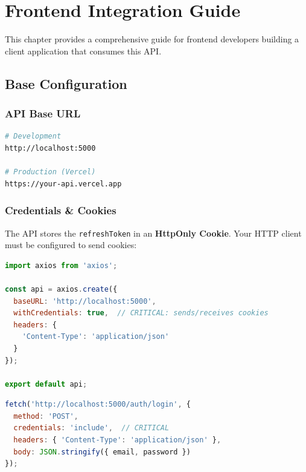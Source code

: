 \chapter{Frontend Integration Guide}

This chapter provides a comprehensive guide for frontend developers building a client application that consumes this API.

\section{Base Configuration}

\subsection{API Base URL}
\begin{lstlisting}[language=bash]
# Development
http://localhost:5000

# Production (Vercel)
https://your-api.vercel.app
\end{lstlisting}

\subsection{Credentials \& Cookies}

The API stores the \texttt{refreshToken} in an \textbf{HttpOnly Cookie}. Your HTTP client must be configured to send cookies:

\begin{lstlisting}[language=JavaScript,title=Axios Setup (Recommended)]
import axios from 'axios';

const api = axios.create({
  baseURL: 'http://localhost:5000',
  withCredentials: true,  // CRITICAL: sends/receives cookies
  headers: {
    'Content-Type': 'application/json'
  }
});

export default api;
\end{lstlisting}

\begin{lstlisting}[language=JavaScript,title=Fetch API Alternative]
fetch('http://localhost:5000/auth/login', {
  method: 'POST',
  credentials: 'include',  // CRITICAL
  headers: { 'Content-Type': 'application/json' },
  body: JSON.stringify({ email, password })
});
\end{lstlisting}

